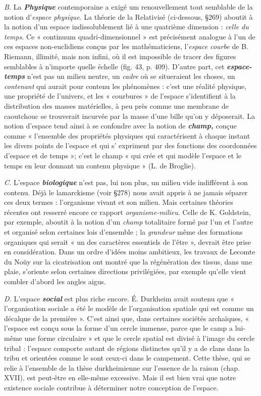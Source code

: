 {\it B.} La \textbf{\textit {Physique}} contemporaine a exigé um renouvellement tout
semblable de la notion d'{\it espace physique}. La théorie de la Relativisé
(ci-dessous, \S 269) aboutit à la notion d’un espace indissolublement lié
à une quatrième dimension : {\it celle du temps}. Ce « continuum quadri-dimensionnel »
est précisément analogue à l’un de ces espaces non-euclidiens
conçus par les mathématiciens, l’{\it espace courbe} de B. Riemann, illimité, mais
non infini, où il est impossible de tracer des
figures semblables à n'importe quelle échelle (fig. 43, p. 409). D'autre
part, cet \textbf{\textit {espace-temps}} n'est pas un milieu neutre, un {\it cadre} où se
situeraient les choses, un {\it contenant} qui aurait pour contenu les phénomènes :
c’est une réalité physique, une propriété de l’univers, et les
« courbures » de l’espace s’identifient à la distribution des masses
matérielles, à peu près comme une membrane de caoutchouc se
trouverait incurvée par la masse d’une bille qu’on y déposerait. La
notion d’espace tend ainsi à se confondre avec la notion de \textbf{\textit {champ,}}
conçue comme « l’ensemble des propriétés physiques qui caractérisent
à chaque instant les divers points de l’espace et qui s’ expriment
par des fonctions des coordonnées d'espace et de temps »; c'est le
champ « qui crée et qui modèle l’espace et le temps en leur donnant
un contenu physique » (L. de Broglie).

{\it C.} L'espace \textbf{\textit {biologique}} n’est pas, lui non plus, un milieu vide
indifférent à son contenu. Déjà le lamarckisme (voir \S 278) nous
avait appris à ne jamais séparer ces deux termes : l'organisme vivant
et son milieu. Mais certaines théories récentes ont resserré encore ce
rapport {\it organisme-milieu}. Celle de K. Goldstein, par exemple,
aboutit à la notion d’un {\it champ} totalitaire formé par l’un et l’autre
et organisé selon certaines lois d’ensemble ; la {\it grandeur} même des
formations organiques qui serait « un des caractères essentiels de
l'être », devrait être prise en considération. Dans un ordre d’idées
moins ambitieux, les travaux de Lecomte du Noüy sur la cicatrisation
ont montré que la régénération des tissus, dans une plaie,
s’oriente selon certaines directions privilégiées, par exemple qu’elle
vient combler d’abord les angles aigus.

{\it D.} L'espace \textbf{\textit {social}} est plus riche encore. É. Durkheim avait soutenu
que « l’organisation sociale a été le modèle de l’organisation spatiale
qui est comme un décalque de la première ». C’est ainsi que, dans certaines
sociétés archaïques, « l’espace est conçu sous la forme d’un
cercle immense, parce que le camp a lui-même une forme circulaire »
et que le cercle spatial est divisé à l’image du cercle tribal : l’espace
comporte autant de régions distinctes qu’il y a de clans dans la tribu
et orientées comme le sont ceux-ci dans le campement. Cette thèse,
qui se relie à l’ensemble de la thèse durkheimienne sur l’essence de
la raison (chap. XVII), est peut-être en elle-même excessive. Mais
il est bien vrai que notre existence sociale contribue à déterminer
notre conception de l’espace.


